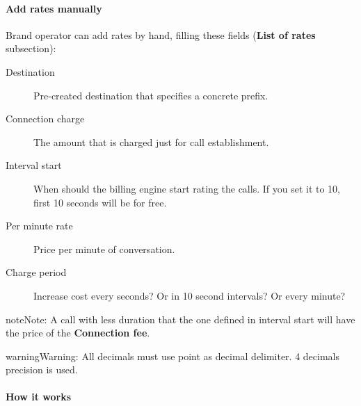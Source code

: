 \documentclass[letterpaper,10pt,english]{sphinxmanual}
\begin{document}
\paragraph{Add rates manually}
\label{administration_portal/brand/billing/destination_rates:add-rates-manually}
Brand operator can add rates by hand, filling these fields (\textbf{List of rates} subsection):
\begin{description}
\item[{Destination}] \leavevmode{}\label{administration_portal/brand/billing/destination_rates:term-destination}
Pre-created destination that specifies a concrete prefix.

\item[{Connection charge}] \leavevmode{}\label{administration_portal/brand/billing/destination_rates:term-connection-charge}
The amount that is charged just for call establishment.

\item[{Interval start}] \leavevmode{}\label{administration_portal/brand/billing/destination_rates:term-interval-start}
When should the billing engine start rating the calls. If you set it to 10, first 10 seconds will be for free.

\item[{Per minute rate}] \leavevmode{}\label{administration_portal/brand/billing/destination_rates:term-per-minute-rate}
Price per minute of conversation.

\item[{Charge period}] \leavevmode{}\label{administration_portal/brand/billing/destination_rates:term-charge-period}
Increase cost every seconds? Or in 10 second intervals? Or every minute?

\end{description}

\begin{notice}{note}{Note:}
A call with less duration that the one defined in interval start will have the price of the \textbf{Connection fee}.
\end{notice}

\begin{notice}{warning}{Warning:}
All decimals must use point as decimal delimiter. 4 decimals precision is used.
\end{notice}
\paragraph{How it works}
\end{document}
